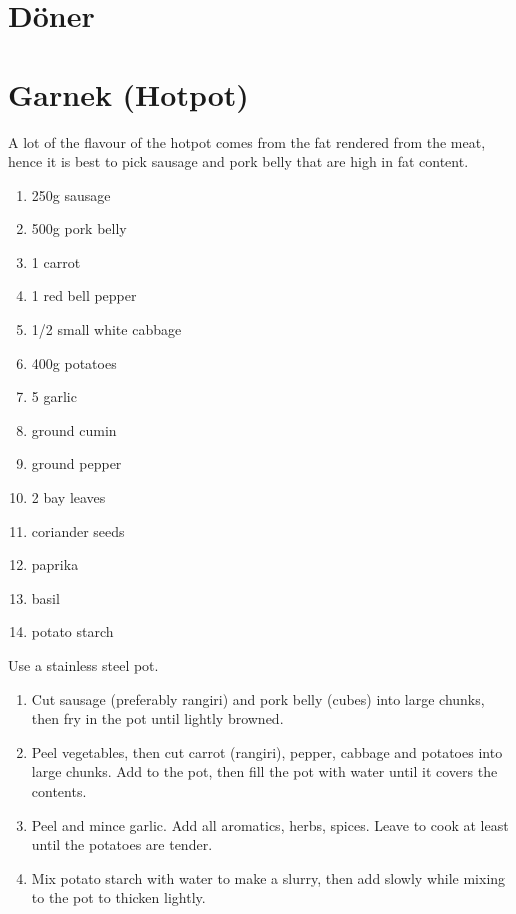 \section{Döner}

\section{Garnek (Hotpot)}
A lot of the flavour of the hotpot comes from the fat rendered from the meat,
hence it is best to pick sausage and pork belly that are high in fat content.

\begin{enumerate}
  \item 250g sausage
  \item 500g pork belly
  \item 1 carrot
  \item 1 red bell pepper
  \item 1/2 small white cabbage
  \item 400g potatoes
  \item 5 garlic
  \item ground cumin
  \item ground pepper
  \item 2 bay leaves
  \item coriander seeds
  \item paprika
  \item basil
  \item potato starch
\end{enumerate}

Use a stainless steel pot.

\begin{enumerate}
  \item Cut sausage (preferably rangiri) and pork belly (cubes) into large
  chunks, then fry in the pot until lightly browned.
  \item Peel vegetables, then cut carrot (rangiri), pepper, cabbage and
  potatoes into large chunks. Add to the pot, then fill the pot with water
  until it covers the contents.
  \item Peel and mince garlic. Add all aromatics, herbs, spices. Leave to cook
  at least until the potatoes are tender.
  \item Mix potato starch with water to make a slurry, then add slowly while
  mixing to the pot to thicken lightly.
\end{enumerate}
